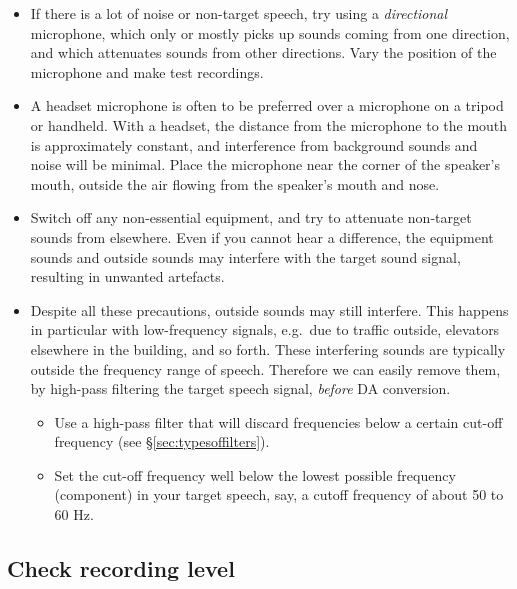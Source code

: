 \documentclass[
]{book}
\providecommand{\tightlist}{%
  \setlength{\itemsep}{0pt}\setlength{\parskip}{0pt}}
\begin{document}
\begin{itemize}
\item
  If there is a lot of noise or non-target speech, try using a \emph{directional} microphone, which only or mostly picks up sounds coming from one direction, and which attenuates sounds from other directions. Vary the position of the microphone and make test recordings.
\item
  A headset microphone is often to be preferred over a microphone on a tripod or handheld. With a headset, the distance from the microphone to the mouth is approximately constant, and interference from background sounds and noise will be minimal. Place the microphone near the corner of the speaker's mouth, outside the air flowing from the speaker's mouth and nose.
\item
  Switch off any non-essential equipment, and try to attenuate non-target sounds from elsewhere. Even if you cannot hear a difference, the equipment sounds and outside sounds may interfere with the target sound signal, resulting in unwanted artefacts.
\item
  Despite all these precautions, outside sounds may still interfere. This happens in particular with low-frequency signals, e.g.~due to traffic outside, elevators elsewhere in the building, and so forth. These interfering sounds are typically outside the frequency range of speech. Therefore we can easily remove them, by high-pass filtering the target speech signal, \emph{before} DA conversion.

  \begin{itemize}
  \tightlist
  \item
    Use a high-pass filter that will discard frequencies below a certain cut-off frequency (see §\ref{sec:typesoffilters}).
  \item
    Set the cut-off frequency well below the lowest possible frequency (component) in your target speech, say, a cutoff frequency of about 50 to 60 Hz.
  \end{itemize}
\end{itemize}

\subsection{Check recording level}\label{sec:recordinglevel}
\end{document}
